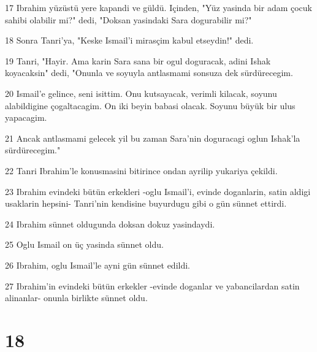 \par 17 Ibrahim yüzüstü yere kapandi ve güldü. Içinden, "Yüz yasinda bir adam çocuk sahibi olabilir mi?" dedi, "Doksan yasindaki Sara dogurabilir mi?"
\par 18 Sonra Tanri'ya, "Keske Ismail'i mirasçim kabul etseydin!" dedi.
\par 19 Tanri, "Hayir. Ama karin Sara sana bir ogul doguracak, adini Ishak koyacaksin" dedi, "Onunla ve soyuyla antlasmami sonsuza dek sürdürecegim.
\par 20 Ismail'e gelince, seni isittim. Onu kutsayacak, verimli kilacak, soyunu alabildigine çogaltacagim. On iki beyin babasi olacak. Soyunu büyük bir ulus yapacagim.
\par 21 Ancak antlasmami gelecek yil bu zaman Sara'nin doguracagi oglun Ishak'la sürdürecegim."
\par 22 Tanri Ibrahim'le konusmasini bitirince ondan ayrilip yukariya çekildi.
\par 23 Ibrahim evindeki bütün erkekleri -oglu Ismail'i, evinde doganlarin, satin aldigi usaklarin hepsini- Tanri'nin kendisine buyurdugu gibi o gün sünnet ettirdi.
\par 24 Ibrahim sünnet oldugunda doksan dokuz yasindaydi.
\par 25 Oglu Ismail on üç yasinda sünnet oldu.
\par 26 Ibrahim, oglu Ismail'le ayni gün sünnet edildi.
\par 27 Ibrahim'in evindeki bütün erkekler -evinde doganlar ve yabancilardan satin alinanlar- onunla birlikte sünnet oldu.

\chapter{18}

